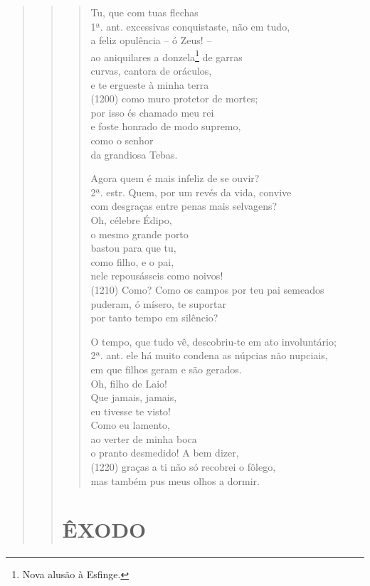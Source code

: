 \begin{verse}
\begin{verse}
\begin{verse}
Tu, que com tuas flechas\\ 1ª. ant.
excessivas conquistaste, não em tudo,\\
a feliz opulência -- ó Zeus! --\\
ao aniquilares a donzela\footnote{Nova alusão à Esfinge.} de garras\\
curvas, cantora de oráculos,\\
e te ergueste à minha terra\\ (1200)
como muro protetor de mortes;\\
por isso és chamado meu rei\\
e foste honrado de modo supremo,\\
como o senhor\\
da grandiosa Tebas.

Agora quem é mais infeliz de se ouvir?\\ 2ª. estr.
Quem, por um revés da vida, convive\\
com desgraças entre penas mais selvagens?\\
Oh, célebre Édipo,\\
o mesmo grande porto\\
bastou para que tu,\\
como filho, e o pai,\\
nele repousásseis como noivos!\\ (1210)
Como? Como os campos por teu pai semeados\\
puderam, ó mísero, te suportar\\
por tanto tempo em silêncio?

O tempo, que tudo vê, descobriu-te em ato involuntário;\\ 2ª. ant.
ele há muito condena as núpcias não nupciais,\\
em que filhos geram e são gerados.\\
Oh, filho de Laio!\\
Que jamais, jamais,\\
eu tivesse te visto!\\
Como eu lamento,\\
ao verter de minha boca\\
o pranto desmedido! A bem dizer,\\ (1220)
graças a ti não só recobrei o fôlego,\\
mas também pus meus olhos a dormir.
\end{verse}


\section{ÊXODO}


\end{verse}
\end{verse}
